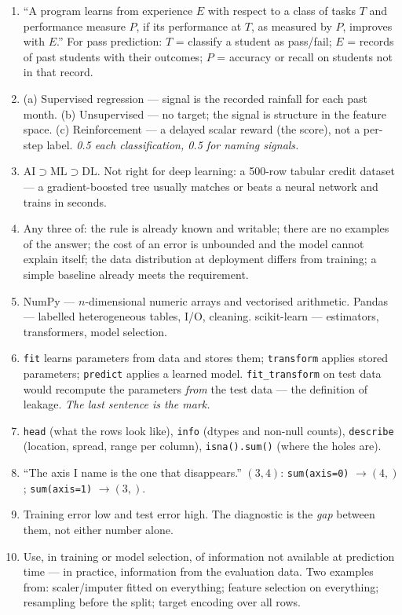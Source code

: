\documentclass[11pt,a4paper]{article}
\newcommand{\A}[1]{\item[\textbf{#1}]}
\begin{document}
\begin{enumerate}[leftmargin=1.9cm]

\A{U1.1} ``A program learns from experience $E$ with respect to a class of
tasks $T$ and performance measure $P$, if its performance at $T$, as measured
by $P$, improves with $E$.'' For pass prediction: $T$ = classify a student as
pass/fail; $E$ = records of past students with their outcomes; $P$ = accuracy
or recall on students not in that record.

\A{U1.2} (a) Supervised regression --- signal is the recorded rainfall for each
past month. (b) Unsupervised --- no target; the signal is structure in the
feature space. (c) Reinforcement --- a delayed scalar reward (the score), not a
per-step label. \emph{0.5 each classification, 0.5 for naming signals.}

\A{U1.3} $\text{AI} \supset \text{ML} \supset \text{DL}$. Not right for deep
learning: a 500-row tabular credit dataset --- a gradient-boosted tree usually
matches or beats a neural network and trains in seconds.

\A{U1.4} Any three of: the rule is already known and writable; there are no
examples of the answer; the cost of an error is unbounded and the model cannot
explain itself; the data distribution at deployment differs from training;
a simple baseline already meets the requirement.

\A{U1.5} NumPy --- $n$-dimensional numeric arrays and vectorised arithmetic.
Pandas --- labelled heterogeneous tables, I/O, cleaning. scikit-learn ---
estimators, transformers, model selection.

\A{U1.6} \texttt{fit} learns parameters from data and stores them;
\texttt{transform} applies stored parameters; \texttt{predict} applies a
learned model. \texttt{fit\_transform} on test data would recompute the
parameters \emph{from} the test data --- the definition of leakage.
\emph{The last sentence is the mark.}

\A{U1.7} \texttt{head} (what the rows look like), \texttt{info} (dtypes and
non-null counts), \texttt{describe} (location, spread, range per column),
\texttt{isna().sum()} (where the holes are).

\A{U1.8} ``The axis I name is the one that disappears.'' $(3,4)$:
\texttt{sum(axis=0)} $\to (4,)$; \texttt{sum(axis=1)} $\to (3,)$.

\A{U1.9} Training error low and test error high. The diagnostic is the
\emph{gap} between them, not either number alone.

\A{U1.10} Use, in training or model selection, of information not available at
prediction time --- in practice, information from the evaluation data. Two
examples from: scaler/imputer fitted on everything; feature selection on
everything; resampling before the split; target encoding over all rows.


\end{enumerate}
\end{document}

